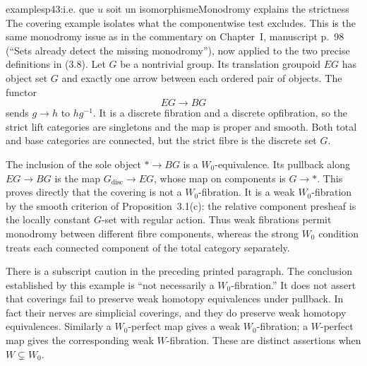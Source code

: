 \begin{dcomment}{examples}{p43:i.e. que $u$ soit un isomorphisme}{Monodromy explains the strictness}
The covering example isolates what the componentwise test excludes. This is the same monodromy issue as in the commentary on Chapter~I, manuscript p.~98 (``Sets already detect the missing monodromy''), now applied to the two precise definitions in (3.8). Let $G$ be a nontrivial group. Its translation groupoid $E G$ has object set $G$ and exactly one arrow between each ordered pair of objects. The functor
\[
 E G\longrightarrow B G
\]
sends $g\longrightarrow h$ to $hg^{-1}$. It is a discrete fibration and a discrete opfibration, so the strict lift categories are singletons and the map is proper and smooth. Both total and base categories are connected, but the strict fibre is the discrete set $G$.

The inclusion of the sole object $*\longrightarrow BG$ is a $W_0$-equivalence. Its pullback along $EG\longrightarrow BG$ is the map $G_{\mathrm{disc}}\longrightarrow EG$, whose map on components is $G\longrightarrow *$. This proves directly that the covering is not a $W_0$-fibration. It is a weak $W_0$-fibration by the smooth criterion of Proposition~3.1(c): the relative component presheaf is the locally constant $G$-set with regular action. Thus weak fibrations permit monodromy between different fibre components, whereas the strong $W_0$ condition treats each connected component of the total category separately.

There is a subscript caution in the preceding printed paragraph. The conclusion established by this example is ``not necessarily a $W_0$-fibration.'' It does not assert that coverings fail to preserve weak homotopy equivalences under pullback. In fact their nerves are simplicial coverings, and they do preserve weak homotopy equivalences. Similarly a $W_0$-perfect map gives a weak $W_0$-fibration; a $W$-perfect map gives the corresponding weak $W$-fibration. These are distinct assertions when $W\subsetneq W_0$.
\end{dcomment}

